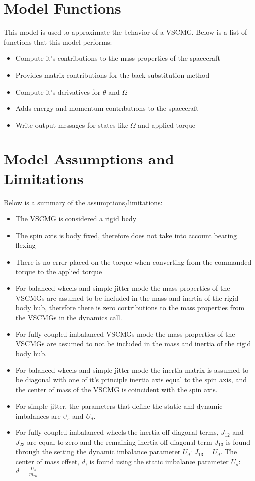 \section{Model Functions}

This model is used to approximate the behavior of a VSCMG. Below is a list of functions that this model performs:

\begin{itemize}
	\item Compute it's contributions to the mass properties of the spacecraft
	\item Provides matrix contributions for the back substitution method
	\item Compute it's derivatives for $\theta$ and $\Omega$
	\item Adds energy and momentum contributions to the spacecraft
	\item Write output messages for states like $\Omega$ and applied torque
\end{itemize}

\section{Model Assumptions and Limitations}
Below is a summary of the assumptions/limitations:

\begin{itemize}
	\item The VSCMG is considered a rigid body
	\item The spin axis is body fixed, therefore does not take into account bearing flexing
	\item There is no error placed on the torque when converting from the commanded torque to the applied torque
	\item For balanced wheels and simple jitter mode the mass properties of the VSCMGs are assumed to be included in the mass and inertia of the rigid body hub, therefore there is zero contributions to the mass properties from the VSCMGs in the dynamics call. 
	\item For fully-coupled imbalanced VSCMGs mode the mass properties of the VSCMGs are assumed to not be included in the mass and inertia of the rigid body hub. 
	\item For balanced wheels and simple jitter mode the inertia matrix is assumed to be diagonal with one of it's principle inertia axis equal to the spin axis, and the center of mass of the VSCMG is coincident with the spin axis. 
	\item For simple jitter, the parameters that define the static and dynamic imbalances are $U_s$ and $U_d$.
	\item For fully-coupled imbalanced wheels the inertia off-diagonal terms, $J_{12}$ and $J_{23}$ are equal to zero and the remaining inertia off-diagonal term $J_{13}$ is found through the setting the dynamic imbalance parameter $U_d$: $J_{13} = U_d$. The center of mass offset, $d$, is found using the static imbalance parameter $U_s$: $d = \frac{U_s}{m_{\text{rw}}}$
\end{itemize}